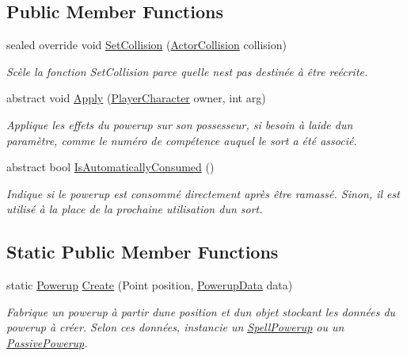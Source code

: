 \subsection*{Public Member Functions}
\begin{DoxyCompactItemize}
\item 
sealed override void \hyperlink{class_tentacle_slicers_1_1powerups_1_1_powerup_ac386acbc8a371cd434c611fb591a9d6b}{Set\+Collision} (\hyperlink{class_tentacle_slicers_1_1collisions_1_1_actor_collision}{Actor\+Collision} collision)
\begin{DoxyCompactList}\small\item\em Scèle la fonction Set\+Collision parce qu\textquotesingle{}elle n\textquotesingle{}est pas destinée à être reécrite. \end{DoxyCompactList}\item 
abstract void \hyperlink{class_tentacle_slicers_1_1powerups_1_1_powerup_a64288aa9b1e9f242082be54f1d73f8ba}{Apply} (\hyperlink{class_tentacle_slicers_1_1actors_1_1_player_character}{Player\+Character} owner, int arg)
\begin{DoxyCompactList}\small\item\em Applique les effets du powerup sur son possesseur, si besoin à l\textquotesingle{}aide d\textquotesingle{}un paramètre, comme le numéro de compétence auquel le sort a été associé. \end{DoxyCompactList}\item 
abstract bool \hyperlink{class_tentacle_slicers_1_1powerups_1_1_powerup_a52c58d3898d05020220fc317b6f901d9}{Is\+Automatically\+Consumed} ()
\begin{DoxyCompactList}\small\item\em Indique si le powerup est consommé directement après être ramassé. Sinon, il est utilisé à la place de la prochaine utilisation d\textquotesingle{}un sort. \end{DoxyCompactList}\end{DoxyCompactItemize}
\subsection*{Static Public Member Functions}
\begin{DoxyCompactItemize}
\item 
static \hyperlink{class_tentacle_slicers_1_1powerups_1_1_powerup}{Powerup} \hyperlink{class_tentacle_slicers_1_1powerups_1_1_powerup_a9aecde45bf218c2241b7454235e68050}{Create} (Point position, \hyperlink{class_tentacle_slicers_1_1powerups_1_1_powerup_data}{Powerup\+Data} data)
\begin{DoxyCompactList}\small\item\em Fabrique un powerup à partir d\textquotesingle{}une position et d\textquotesingle{}un objet stockant les données du powerup à créer. Selon ces données, instancie un \hyperlink{class_tentacle_slicers_1_1powerups_1_1_spell_powerup}{Spell\+Powerup} ou un \hyperlink{class_tentacle_slicers_1_1powerups_1_1_passive_powerup}{Passive\+Powerup}. \end{DoxyCompactList}\end{DoxyCompactItemize}
